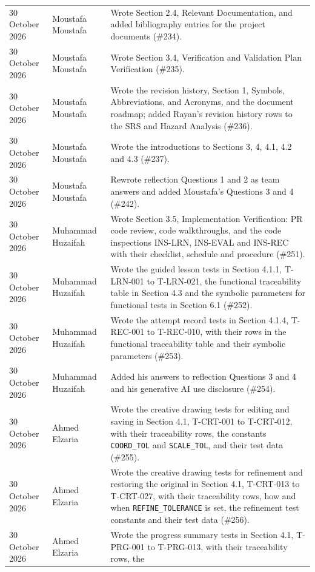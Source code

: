\documentclass[12pt, titlepage]{article}
\begin{document}
{\begin{longtable}{@{}p{3cm}>{\raggedright\arraybackslash}p{3.3cm}
>{\raggedright\arraybackslash}p{\dimexpr\textwidth-6.3cm-4\tabcolsep\relax}@{}}
30 October 2026 & Moustafa Moustafa & Wrote Section 2.4, Relevant
Documentation, and added bibliography entries for the project documents
(\#234).\\
30 October 2026 & Moustafa Moustafa & Wrote Section 3.4, Verification and
Validation Plan Verification (\#235).\\
30 October 2026 & Moustafa Moustafa & Wrote the revision history, Section 1,
Symbols, Abbreviations, and Acronyms, and the document roadmap; added Rayan's
revision history rows to the SRS and Hazard Analysis (\#236).\\
30 October 2026 & Moustafa Moustafa & Wrote the introductions to Sections 3,
4, 4.1, 4.2 and 4.3 (\#237).\\
30 October 2026 & Moustafa Moustafa & Rewrote reflection Questions 1 and 2 as
team answers and added Moustafa's Questions 3 and 4 (\#242).\\
30 October 2026 & Muhammad Huzaifah & Wrote Section 3.5, Implementation
Verification: PR code review, code walkthroughs, and the code inspections
INS-LRN, INS-EVAL and INS-REC with their checklist, schedule and procedure
(\#251).\\
30 October 2026 & Muhammad Huzaifah & Wrote the guided lesson tests in
Section 4.1.1, T-LRN-001 to T-LRN-021, the functional traceability table in
Section 4.3 and the symbolic parameters for functional tests in Section 6.1
(\#252).\\
30 October 2026 & Muhammad Huzaifah & Wrote the attempt record tests in
Section 4.1.4, T-REC-001 to T-REC-010, with their rows in the functional
traceability table and their symbolic parameters (\#253).\\
30 October 2026 & Muhammad Huzaifah & Added his answers to reflection
Questions 3 and 4 and his generative AI use disclosure (\#254).\\
30 October 2026 & Ahmed Elzaria & Wrote the creative drawing tests for
editing and saving in Section 4.1, T-CRT-001 to T-CRT-012, with their
traceability rows, the constants \texttt{COORD\_TOL} and
\texttt{SCALE\_TOL}, and their test data (\#255).\\
30 October 2026 & Ahmed Elzaria & Wrote the creative drawing tests for
refinement and restoring the original in Section 4.1, T-CRT-013 to
T-CRT-027, with their traceability rows, how and when
\texttt{REFINE\_TOLERANCE} is set, the refinement test constants and their
test data (\#256).\\
30 October 2026 & Ahmed Elzaria & Wrote the progress summary tests in
Section 4.1, T-PRG-001 to T-PRG-013, with their traceability rows, the

\end{longtable}}
\end{document}
